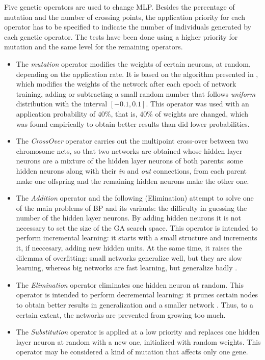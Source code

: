 \documentclass{elsart}
\begin{document}
Five genetic operators are used to change MLP. Besides the percentage of mutation and the number of crossing points, the application priority for each operator has to be specified to indicate the number of individuals generated by each genetic operator. The tests have been done using a higher priority for mutation and the same level for the remaining operators. 
\begin{itemize}

\item The \emph{mutation} operator modifies the weights of certain neurons, at random, depending on the application rate. It is based on the algorithm presented in \cite{Kinnebrock}, which modifies the weights of the network after each epoch of network training, adding or subtracting a small random number that follows \emph{uniform} distribution with the interval $[-0.1,0.1]$.
This operator was used with an application probability of $40\%$, that is, $40\%$ of weights are changed, which was found empirically to obtain better results than did lower probabilities.

\item The \emph{CrossOver} operator carries out the multipoint cross-over between two chromosome nets, so that two networks are obtained whose hidden layer neurons are a mixture of the hidden layer neurons of both parents: some hidden neurons along with their \emph{in} and \emph{out} connections, from each parent make one offspring and the remaining hidden neurons make the other one.

\item The \emph{Addition} operator and the following (Elimination) attempt to solve one of the main problems of BP and its variants: the difficulty in guessing the number of the hidden layer neurons. By adding hidden neurons it is not necessary to set the size of the GA search space.
This operator is intended to perform incremental learning: it starts with a small structure and increments it, if neccesary, adding new hidden units. 
At the same time, it raises the dilemma of overfitting: small networks generalize well, but they are slow learning, whereas big networks are fast learning, but generalize badly \cite{Bellido,Bebis}.

\item The \emph{Elimination} operator eliminates one hidden neuron at random. This operator is intended to perform decremental learning: it prunes certain nodes to obtain better results in generalization and a smaller network \cite{Jasic,Pelillo,Bebis}. Thus, to a certain extent, the networks are prevented from growing too much.

\item The \emph{Substitution} operator is applied at a low priority and replaces one hidden layer neuron at random with a new one, initialized with random weights. This operator may be considered a kind of mutation that affects only one gene.

\end{itemize}
\end{document}

